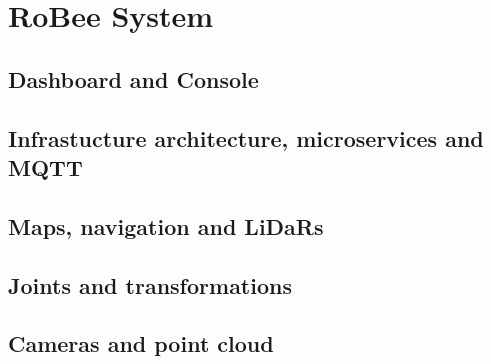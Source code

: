 
\section{RoBee System}

\subsection{Dashboard and Console}

\subsection{Infrastucture architecture, microservices and MQTT}

\subsection{Maps, navigation and LiDaRs}

\subsection{Joints and transformations}

\subsection{Cameras and point cloud}

